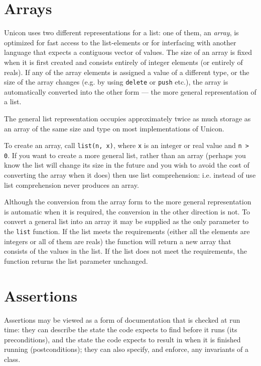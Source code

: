 \section{Arrays}
Unicon uses two different representations for a list: one of them, an
{\em array}, is optimized for fast access to the list-elements or for
interfacing with another language that expects a contiguous vector of
values. The size of an array is fixed when it is first created and
consists entirely of integer elements (or entirely of reals). If any
of the array elements is assigned a value of a different type, or the
size of the array changes (e.g. by using \texttt{delete} or
\texttt{push} etc.), the array is automatically converted into the
other form --- the more general representation of a list.

The general list representation occupies approximately twice as much
storage as an array of the same size and type on most implementations
of Unicon.

To create an array, call \texttt{list(n, x)}, where \texttt{x} is an
integer or real value and \texttt{n > 0}. If you want to create a more
general list, rather than an array (perhaps you know the list will
change its size in the future and you wish to avoid the cost of
converting the array when it does) then use list comprehension:
i.e. instead of
\noindent use
\noindent list comprehension never produces an array.

Although the conversion from the array form to the more general
representation is automatic when it is required, the conversion in the
other direction is not. To convert a general list into an array it may
be supplied as the only parameter to the \texttt{list} function. If
the list meets the requirements (either all the elements are integers
or all of them are reals) the function will return a new array that
consists of the values in the list. If the list does not meet the
requirements, the function returns the list parameter unchanged.

\section{Assertions}

 Assertions may be viewed as a form of documentation that is checked at run
 time: they can describe the state the code expects to find before it runs
 (its preconditions), and the state the code expects to result in when it
 is finished running (postconditions); they can also specify, and enforce,
 any invariants of a class.

